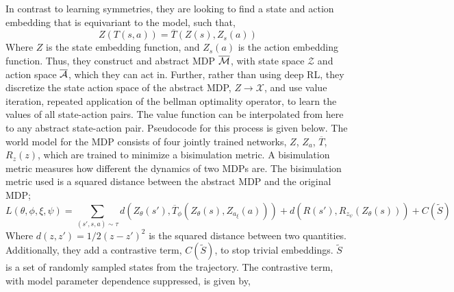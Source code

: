 In contrast to learning symmetries, they are looking to find a state and action embedding that is equivariant to the model, such that,
\begin{equation}
	Z(T(s, a)) = \overline{T}(Z(s), Z_s(a))
\end{equation}
Where $Z$ is the state embedding function, and $Z_s(a)$ is the action embedding function. Thus, they construct and abstract MDP $\overline{\mathcal{M}}$, with state space $\mathcal{Z}$ and action space $\overline{\mathcal{A}}$, which they can act in. Further, rather than using deep RL, they discretize the state action space of the abstract MDP, $Z \rightarrow \mathcal{X}$, and use value iteration, repeated application of the bellman optimality operator, to learn the values of all state-action pairs. The value function can be interpolated from here to any abstract state-action pair. Pseudocode for this process is given below. The world model for the MDP consists of four jointly trained networks, $Z$, $Z_a$, $\overline{T}$,$R_z(z)$, which are trained to minimize a bisimulation metric. A bisimulation metric measures how different the dynamics of two MDPs are. The bisimulation metric used is a squared distance between the abstract MDP and the original MDP;
\begin{equation}
	L(\theta, \phi, \xi, \psi) = \sum_{(s', s, a) \sim \tau} d(Z_\theta (s'), \overline{T}_\phi(Z_\theta(s), Z_{a_\xi}(a))) +  d(R(s'), R_{z_\psi}(Z_\theta (s))) + C(\tilde{S})
\end{equation}
Where $d(z, z') = 1/2 (z - z')^2$ is the squared distance between two quantities. Additionally, they add a contrastive term, $C(\tilde{S})$, to stop trivial embeddings. $\tilde{S}$ is a set of randomly sampled states from the trajectory. The contrastive term, with model parameter dependence suppressed, is given by,

